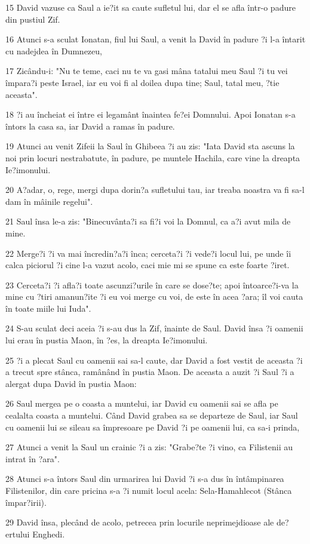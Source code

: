 \par 15 David vazuse ca Saul a ie?it sa caute sufletul lui, dar el se afla într-o padure din pustiul Zif.
\par 16 Atunci s-a sculat Ionatan, fiul lui Saul, a venit la David în padure ?i l-a întarit cu nadejdea în Dumnezeu,
\par 17 Zicându-i: "Nu te teme, caci nu te va gasi mâna tatalui meu Saul ?i tu vei împara?i peste Israel, iar eu voi fi al doilea dupa tine; Saul, tatal meu, ?tie aceasta".
\par 18 ?i au încheiat ei între ei legamânt înaintea fe?ei Domnului. Apoi Ionatan s-a întors la casa sa, iar David a ramas în padure.
\par 19 Atunci au venit Zifeii la Saul în Ghibeea ?i au zis: "Iata David sta ascuns la noi prin locuri nestrabatute, în padure, pe muntele Hachila, care vine la dreapta Ie?imonului.
\par 20 A?adar, o, rege, mergi dupa dorin?a sufletului tau, iar treaba noastra va fi sa-l dam în mâinile regelui".
\par 21 Saul însa le-a zis: "Binecuvânta?i sa fi?i voi la Domnul, ca a?i avut mila de mine.
\par 22 Merge?i ?i va mai încredin?a?i înca; cerceta?i ?i vede?i locul lui, pe unde îi calca piciorul ?i cine l-a vazut acolo, caci mie mi se spune ca este foarte ?iret.
\par 23 Cerceta?i ?i afla?i toate ascunzi?urile în care se dose?te; apoi întoarce?i-va la mine cu ?tiri amanun?ite ?i eu voi merge cu voi, de este în acea ?ara; îl voi cauta în toate miile lui Iuda".
\par 24 S-au sculat deci aceia ?i s-au dus la Zif, înainte de Saul. David însa ?i oamenii lui erau în pustia Maon, în ?es, la dreapta Ie?imonului.
\par 25 ?i a plecat Saul cu oamenii sai sa-l caute, dar David a fost vestit de aceasta ?i a trecut spre stânca, ramânând în pustia Maon. De aceasta a auzit ?i Saul ?i a alergat dupa David în pustia Maon:
\par 26 Saul mergea pe o coasta a muntelui, iar David cu oamenii sai se afla pe cealalta coasta a muntelui. Când David grabea sa se departeze de Saul, iar Saul cu oamenii lui se sileau sa împresoare pe David ?i pe oamenii lui, ca sa-i prinda,
\par 27 Atunci a venit la Saul un crainic ?i a zis: "Grabe?te ?i vino, ca Filistenii au intrat în ?ara".
\par 28 Atunci s-a întors Saul din urmarirea lui David ?i s-a dus în întâmpinarea Filistenilor, din care pricina s-a ?i numit locul acela: Sela-Hamahlecot (Stânca împar?irii).
\par 29 David însa, plecând de acolo, petrecea prin locurile neprimejdioase ale de?ertului Enghedi.

